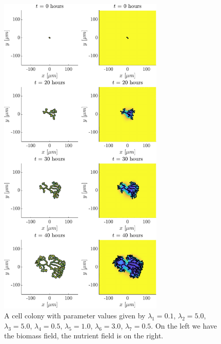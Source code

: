 \begin{figure}[!htb] %
    \centering
    \includegraphics[width= 0.7\textwidth]{
        chapter4/figures/t_all_L1_0o10_L2_5o00_L3_5o00_L4_0o50_L5_1o00_L6_3o00_L7_0o50.pdf}
    \caption{A cell colony with parameter values given by
             $\lambda_1 = 0.1$,  
             $\lambda_2 = 5.0$, 
             $\lambda_3 = 5.0$, 
             $\lambda_4 = 0.5$, 
             $\lambda_5 = 1.0$, 
             $\lambda_6 = 3.0$, 
             $\lambda_7 = 0.5$. 
             On the left we have the biomass field, the nutrient field is on the right.}
    \label{fig:colony1}
\end{figure}

